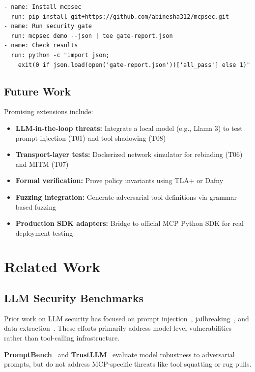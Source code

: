 \documentclass[11pt]{article}
\begin{document}
\begin{lstlisting}
- name: Install mcpsec
  run: pip install git+https://github.com/abinesha312/mcpsec.git
- name: Run security gate
  run: mcpsec demo --json | tee gate-report.json
- name: Check results
  run: python -c "import json; 
    exit(0 if json.load(open('gate-report.json'))['all_pass'] else 1)"
\end{lstlisting}

\subsection{Future Work}

Promising extensions include:

\begin{itemize}
    \item \textbf{LLM-in-the-loop threats:} Integrate a local model (e.g., Llama 3) to test prompt injection (T01) and tool shadowing (T08)
    \item \textbf{Transport-layer tests:} Dockerized network simulator for rebinding (T06) and MITM (T07)
    \item \textbf{Formal verification:} Prove policy invariants using TLA+ or Dafny
    \item \textbf{Fuzzing integration:} Generate adversarial tool definitions via grammar-based fuzzing
    \item \textbf{Production SDK adapters:} Bridge to official MCP Python SDK for real deployment testing
\end{itemize}

\section{Related Work}
\label{sec:related}

\subsection{LLM Security Benchmarks}

Prior work on LLM security has focused on prompt injection~\cite{perez2022ignore}, jailbreaking~\cite{wei2023jailbroken}, and data extraction~\cite{carlini2021extracting}. These efforts primarily address model-level vulnerabilities rather than tool-calling infrastructure.

\textbf{PromptBench}~\cite{zhu2023promptbench} and \textbf{TrustLLM}~\cite{sun2024trustllm} evaluate model robustness to adversarial prompts, but do not address MCP-specific threats like tool squatting or rug pulls.
\end{document}
